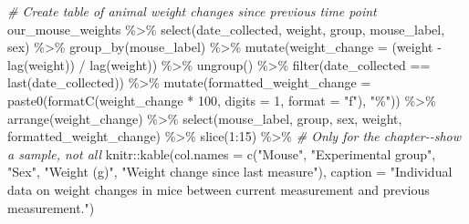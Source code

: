 \documentclass[
]{book}
\newenvironment{Shaded}{\begin{snugshade}}{\end{snugshade}}
\newcommand{\AttributeTok}[1]{\textcolor[rgb]{0.77,0.63,0.00}{#1}}
\newcommand{\CommentTok}[1]{\textcolor[rgb]{0.56,0.35,0.01}{\textit{#1}}}
\newcommand{\DecValTok}[1]{\textcolor[rgb]{0.00,0.00,0.81}{#1}}
\newcommand{\FunctionTok}[1]{\textcolor[rgb]{0.00,0.00,0.00}{#1}}
\newcommand{\NormalTok}[1]{#1}
\newcommand{\SpecialCharTok}[1]{\textcolor[rgb]{0.00,0.00,0.00}{#1}}
\newcommand{\StringTok}[1]{\textcolor[rgb]{0.31,0.60,0.02}{#1}}
\begin{document}
\begin{Shaded}
\begin{Highlighting}[]
\CommentTok{\# Create table of animal weight changes since previous time point}
\NormalTok{our\_mouse\_weights }\SpecialCharTok{\%\textgreater{}\%} 
  \FunctionTok{select}\NormalTok{(date\_collected, weight, group, mouse\_label, sex) }\SpecialCharTok{\%\textgreater{}\%} 
  \FunctionTok{group\_by}\NormalTok{(mouse\_label) }\SpecialCharTok{\%\textgreater{}\%} 
  \FunctionTok{mutate}\NormalTok{(}\AttributeTok{weight\_change =}\NormalTok{ (weight }\SpecialCharTok{{-}} \FunctionTok{lag}\NormalTok{(weight)) }\SpecialCharTok{/} \FunctionTok{lag}\NormalTok{(weight)) }\SpecialCharTok{\%\textgreater{}\%} 
  \FunctionTok{ungroup}\NormalTok{() }\SpecialCharTok{\%\textgreater{}\%} 
  \FunctionTok{filter}\NormalTok{(date\_collected }\SpecialCharTok{==} \FunctionTok{last}\NormalTok{(date\_collected)) }\SpecialCharTok{\%\textgreater{}\%} 
  \FunctionTok{mutate}\NormalTok{(}\AttributeTok{formatted\_weight\_change =} \FunctionTok{paste0}\NormalTok{(}\FunctionTok{formatC}\NormalTok{(weight\_change }\SpecialCharTok{*} \DecValTok{100}\NormalTok{, }
                                                  \AttributeTok{digits =} \DecValTok{1}\NormalTok{, }\AttributeTok{format =} \StringTok{"f"}\NormalTok{), }\StringTok{"\%"}\NormalTok{)) }\SpecialCharTok{\%\textgreater{}\%} 
  \FunctionTok{arrange}\NormalTok{(weight\_change) }\SpecialCharTok{\%\textgreater{}\%} 
  \FunctionTok{select}\NormalTok{(mouse\_label, group, sex, weight, formatted\_weight\_change) }\SpecialCharTok{\%\textgreater{}\%} 
  \FunctionTok{slice}\NormalTok{(}\DecValTok{1}\SpecialCharTok{:}\DecValTok{15}\NormalTok{) }\SpecialCharTok{\%\textgreater{}\%}  \CommentTok{\# Only for the chapter{-}{-}show a sample, not all}
\NormalTok{  knitr}\SpecialCharTok{::}\FunctionTok{kable}\NormalTok{(}\AttributeTok{col.names =} \FunctionTok{c}\NormalTok{(}\StringTok{"Mouse"}\NormalTok{, }\StringTok{"Experimental group"}\NormalTok{, }\StringTok{"Sex"}\NormalTok{, }
                             \StringTok{"Weight (g)"}\NormalTok{, }\StringTok{"Weight change since last measure"}\NormalTok{), }
               \AttributeTok{caption =} \StringTok{"Individual data on weight changes in mice between current measurement and previous measurement."}\NormalTok{)}
\end{Highlighting}
\end{Shaded}
\end{document}
